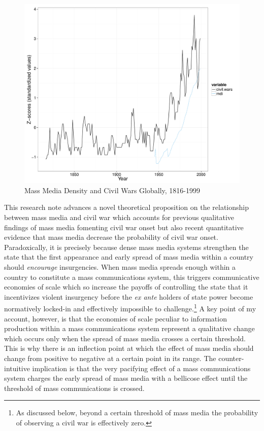 \documentclass[11pt,article,oneside]{memoir}
\makeatletter
\def\maxwidth{\ifdim\Gin@nat@width>\linewidth\linewidth
\else\Gin@nat@width\fi}
\let\Oldincludegraphics\includegraphics
\renewcommand{\includegraphics}[1]{\Oldincludegraphics[width=\maxwidth]{#1}}
\makeatother
\begin{document}
\begin{figure}[htbp]
\centering
\includegraphics{./media_civil_war_files/figure-markdown/globalplot.pdf}
\caption{Mass Media Density and Civil Wars Globally, 1816-1999}
\end{figure}

This research note advances a novel theoretical proposition on the
relationship between mass media and civil war which accounts for
previous qualitative findings of mass media fomenting civil war onset
but also recent quantitative evidence that mass media decrease the
probability of civil war onset. Paradoxically, it is precisely because
dense mass media systems strengthen the state that the first appearance
and early spread of mass media within a country should \emph{encourage}
insurgencies. When mass media spreads enough within a country to
constitute a mass communications system, this triggers communicative
economies of scale which so increase the payoffs of controlling the
state that it incentivizes violent insurgency before the \emph{ex ante}
holders of state power become normatively locked-in and effectively
impossible to challenge.\footnote{As discussed below, beyond a certain
  threshold of mass media the probability of observing a civil war is
  effectively zero.} A key point of my account, however, is that the
economies of scale peculiar to information production within a mass
communications system represent a qualitative change which occurs only
when the spread of mass media crosses a certain threshold. This is why
there is an inflection point at which the effect of mass media should
change from positive to negative at a certain point in its range. The
counter-intuitive implication is that the very pacifying effect of a
mass communications system charges the early spread of mass media with a
bellicose effect until the threshold of mass communications is crossed.
\end{document}
